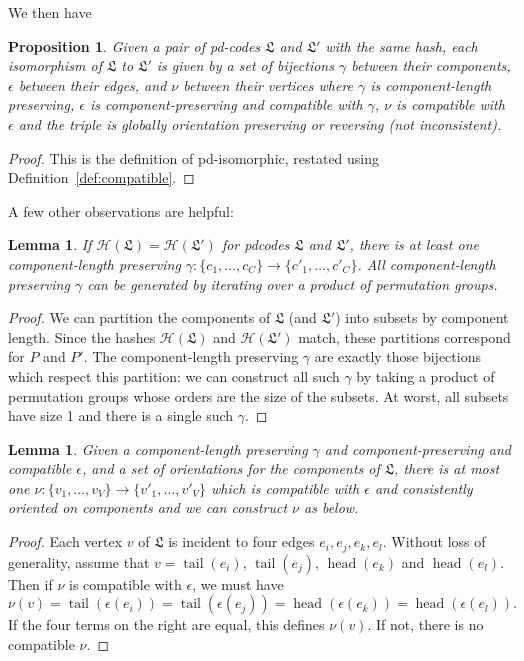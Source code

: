 \documentclass[amsmath,secnumarabic,floatfix,amssymb,nofootinbib,nobibnotes,letterpaper,11pt,tightenlines,showkeys]{revtex4}
\newtheorem{lemma}[theorem]{Lemma}
\newtheorem{proposition}[theorem]{Proposition}
\theoremstyle{definition}
\newcommand{\head}{\operatorname{head}}
\newcommand{\tail}{\operatorname{tail}}
\begin{document}
We then have
\begin{proposition}
Given a pair of pd-codes $\mathfrak{L}$ and $\mathfrak{L}'$ with the same hash, each isomorphism of $\mathfrak{L}$ to $\mathfrak{L}'$ is given by a set of bijections $\gamma$ between their components, $\epsilon$ between their edges, and $\nu$ between their vertices where $\gamma$ is component-length preserving, $\epsilon$ is component-preserving and compatible with $\gamma$, $\nu$ is compatible with $\epsilon$ and the triple is globally orientation preserving or reversing (not inconsistent).
\end{proposition}

\begin{proof}
This is the definition of pd-isomorphic, restated using Definition~\ref{def:compatible}.
\end{proof}

A few other observations are helpful:
\begin{lemma}
If $\mathcal{H}(\mathfrak{L}) = \mathcal{H}(\mathfrak{L}')$ for pdcodes $\mathfrak{L}$ and $\mathfrak{L}'$, there is at least one component-length preserving $\gamma : \{c_1,\dots,c_C\} \rightarrow \{c'_1,\dots,c'_C\}$. All component-length preserving $\gamma$ can be generated by iterating over a product of permutation groups.
\end{lemma}

\begin{proof}
We can partition the components of $\mathfrak{L}$ (and $\mathfrak{L}'$) into subsets by component length. Since the hashes $\mathcal{H}(\mathfrak{L})$ and $\mathcal{H}(\mathfrak{L}')$ match, these partitions correspond for $P$ and $P'$. The component-length preserving $\gamma$ are exactly those bijections which respect this partition: we can construct all such $\gamma$ by taking a product of permutation groups whose orders are the size of the subsets. At worst, all subsets have size 1 and there is a single such $\gamma$.
\end{proof}

\begin{lemma}
Given a component-length preserving $\gamma$ and component-preserving and compatible $\epsilon$, and a set of orientations for the components of $\mathfrak{L}$, there is at most one $\nu : \{v_1, \dots, v_V\} \rightarrow \{v'_1,\dots,v'_V\}$ which is compatible with $\epsilon$ and consistently oriented on components and we can construct $\nu$ as below.
\end{lemma}

\begin{proof}
Each vertex $v$ of $\mathfrak{L}$ is incident to four edges $e_i, e_j, e_k, e_l$. Without loss of generality, assume that $v = \tail(e_i)$, $\tail(e_j)$, $\head(e_k)$ and $\head(e_l)$. Then if $\nu$ is compatible with $\epsilon$, we must have
\begin{equation*}
\nu(v) = \tail(\epsilon(e_i)) = \tail(\epsilon(e_j)) = \head(\epsilon(e_k)) = \head(\epsilon(e_l)).
\end{equation*}
If the four terms on the right are equal, this defines $\nu(v)$. If not, there is no compatible $\nu$.
\end{proof}
\end{document}
